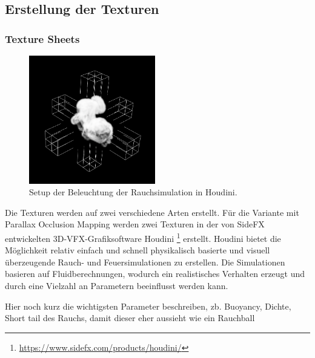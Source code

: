 \subsection{Erstellung der Texturen}
\label{sec:4.2}


\subsubsection{Texture Sheets}
\label{sec:4.2.1}
\begin{figure}[h!]
	\includegraphics[width=0.49\textwidth]{Grafiken/Implementation/Lightmaps/Smoke_LightSetup.png}
	\centering
	\begin{footnotesize}
		\caption{Setup der Beleuchtung der Rauchsimulation in Houdini.}
		\label{fig:lightSetup}
	\end{footnotesize}
\end{figure}

Die Texturen werden auf zwei verschiedene Arten erstellt. Für die Variante mit Parallax Occlusion Mapping werden zwei
Texturen in der von SideFX entwickelten 3D-VFX-Grafiksoftware Houdini \footnote{\url{https://www.sidefx.com/products/houdini/}} erstellt.
Houdini bietet die Möglichkeit relativ einfach und schnell physikalisch basierte und visuell überzeugende Rauch- und Feuersimulationen zu erstellen.
Die Simulationen basieren auf Fluidberechnungen, wodurch ein realistisches Verhalten erzeugt und durch eine Vielzahl an Parametern beeinflusst werden kann.

Hier noch kurz die wichtigsten Parameter beschreiben, zb. Buoyancy, Dichte, Short tail des Rauchs, damit dieser eher aussieht wie ein Rauchball

